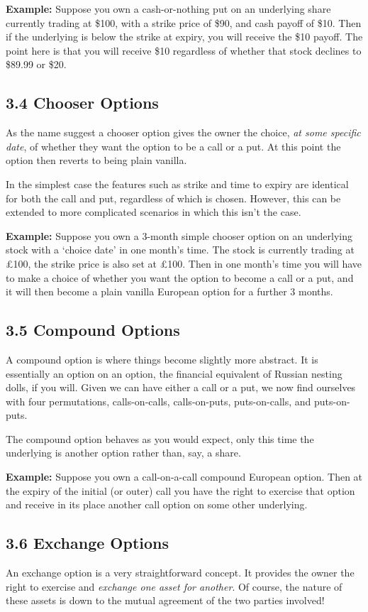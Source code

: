\documentclass[11pt]{article}
\begin{document}
\textbf{Example:} Suppose you own a cash-or-nothing put on an underlying share currently trading at \$100, with a strike price of \$90, and cash payoff of \$10. Then if the underlying is below the strike at expiry, you will receive the \$10 payoff. The point here is that you will receive \$10 regardless of whether that stock declines to \$89.99 or \$20.

\subsection*{3.4 Chooser Options}
As the name suggest a chooser option gives the owner the choice, \textit{at some specific date}, of whether they want the option to be a call or a put. At this point the option then reverts to being plain vanilla. 

In the simplest case the features such as strike and time to expiry are identical for both the call and put, regardless of which is chosen. However, this can be extended to more complicated scenarios in which this isn't the case. 

\textbf{Example:} Suppose you own a 3-month simple chooser option on an underlying stock with a `choice date' in one month's time. The stock is currently trading at £100, the strike price is also set at £100. Then in one month's time you will have to make a choice of whether you want the option to become a call or a put, and it will then become a plain vanilla European option for a further 3 months.

\subsection*{3.5 Compound Options}
A compound option is where things become slightly more abstract. It is essentially an option on an option, the financial equivalent of Russian nesting dolls, if you will. Given we can have either a call or a put, we now find ourselves with four permutations, calls-on-calls, calls-on-puts, puts-on-calls, and puts-on-puts. 

The compound option behaves as you would expect, only this time the underlying is another option rather than, say, a share.

\textbf{Example:} Suppose you own a call-on-a-call compound European option. Then at the expiry of the initial (or outer) call you have the right to exercise that option and receive in its place another call option on some other underlying. 

\subsection*{3.6 Exchange Options}
An exchange option is a very straightforward concept. It provides the owner the right to exercise and \textit{exchange one asset for another}. Of course, the nature of these assets is down to the mutual agreement of the two parties involved!
\end{document}
